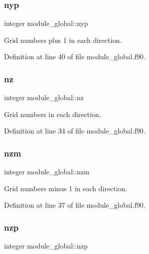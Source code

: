 \subsubsection{\texorpdfstring{nyp}{nyp}}
{\footnotesize\ttfamily integer module\+\_\+global\+::nyp}



Grid numbers plus 1 in each direction. 



Definition at line 40 of file module\+\_\+global.\+f90.

\mbox{\label{namespacemodule__global_a5af0cf8dfa1e807f0ee9d14572e8b854}} 
\subsubsection{\texorpdfstring{nz}{nz}}
{\footnotesize\ttfamily integer module\+\_\+global\+::nz}



Grid numbers in each direction. 



Definition at line 34 of file module\+\_\+global.\+f90.

\mbox{\label{namespacemodule__global_a267d58e2cb3e1d5869114102f99fa203}} 
\subsubsection{\texorpdfstring{nzm}{nzm}}
{\footnotesize\ttfamily integer module\+\_\+global\+::nzm}



Grid numbers minus 1 in each direction. 



Definition at line 37 of file module\+\_\+global.\+f90.

\mbox{\label{namespacemodule__global_a8ceb9b0d81231e3a40bfc849fd7b2a4f}} 
\subsubsection{\texorpdfstring{nzp}{nzp}}
{\footnotesize\ttfamily integer module\+\_\+global\+::nzp}



